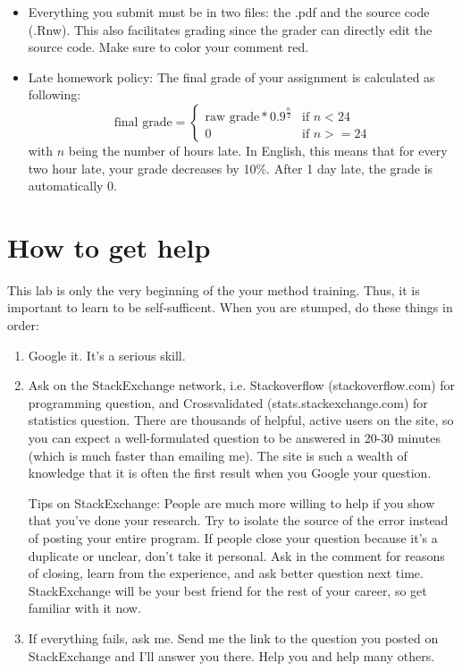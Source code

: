 \documentclass{article}\usepackage[]{graphicx}\usepackage[]{color}
\newenvironment{knitrout}{}{} %
\begin{document}
\begin{itemize}
\begin{knitrout}
\end{knitrout}

\item Everything you submit must be in two files: the .pdf and the source code (.Rnw). This also facilitates grading since the grader can directly edit the source code. {\color{red}Make sure to color your comment red}.

\item Late homework policy: The final grade of your assignment is calculated as following:
\[
\text{final grade} = \begin{cases}
      \text{raw grade} * 0.9^{\frac{n}{2}} & \text{if $n < 24$} \\
      0 & \text{if $n >= 24$}
    \end{cases}
\]
with $n$ being the number of hours late. In English, this means that for every two hour late, your grade decreases by 10\%. After 1 day late, the grade is automatically 0.
\end{itemize}

\section{How to get help}

This lab is only the very beginning of the your method training. Thus, it is important to learn to be self-sufficent. When you are stumped, do these things in order:

\begin{enumerate}
  \item Google it. It's a serious skill.
  \item Ask on the StackExchange network, i.e. Stackoverflow (stackoverflow.com) for programming question, and Crossvalidated (stats.stackexchange.com) for statistics question. There are thousands of helpful, active users on the site, so you can expect a well-formulated question to be answered in 20-30 minutes (which is much faster than emailing me). The site is such a wealth of knowledge that it is often the first result when you Google your question.

  Tips on StackExchange: People are much more willing to help if you show that you've done your research. Try to isolate the source of the error instead of posting your entire program. If people close your question because it's a duplicate or unclear, don't take it personal. Ask in the comment for reasons of closing, learn from the experience, and ask better question next time. StackExchange will be your best friend for the rest of your career, so get familiar with it now.

  \item If everything fails, ask me. Send me the link to the question you posted on StackExchange and I'll answer you there. Help you and help many others.
\end{enumerate}
\end{document}
